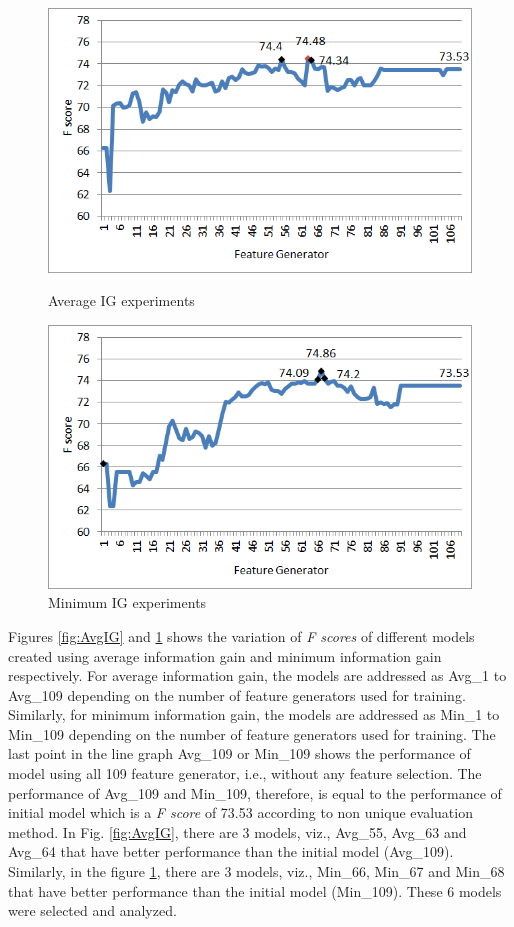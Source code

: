 \begin{figure}
\centering
\begin{minipage}{.5\textwidth}
  \centering
  \includegraphics[width=.95\textwidth]{figures/AvgIGAnalysis.png}
  \caption{Average IG experiments}
  \label{fig:AvgIG}
\end{minipage}%
\begin{minipage}{.5\textwidth}
  \centering
  \includegraphics[width=.95\textwidth]{figures/MinIGAnalysis.png}
  \caption{Minimum IG experiments}
  \label{fig:MinIG}
\end{minipage}
\end{figure}

Figures \ref{fig:AvgIG} and \ref{fig:MinIG} shows the variation of \textit{F scores} of different models created using average information gain and minimum information gain respectively. For average information gain, the models are addressed as Avg\_1 to Avg\_109 depending on the number of feature generators used for training. Similarly, for minimum information gain, the models are addressed as Min\_1 to Min\_109 depending on the number of feature generators used for training. The last point in the line graph Avg\_109 or Min\_109 shows the performance of model using all 109 feature generator, i.e., without any feature selection. The performance of Avg\_109 and Min\_109, therefore, is equal to the performance of initial model which is a \textit{F score} of 73.53 according to non unique evaluation method. In Fig. \ref{fig:AvgIG}, there are 3 models, viz., Avg\_55, Avg\_63 and Avg\_64 that have better performance than the initial model (Avg\_109). Similarly, in the figure \ref{fig:MinIG}, there are 3 models, viz., Min\_66, Min\_67 and Min\_68 that have better performance than the initial model (Min\_109). These 6 models were selected and analyzed.

